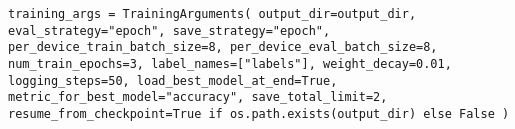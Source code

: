 
\begin{lstlisting}[style=mypython, caption={Training Arguments}] 
training_args = TrainingArguments( output_dir=output_dir, eval_strategy="epoch", save_strategy="epoch", per_device_train_batch_size=8, per_device_eval_batch_size=8, num_train_epochs=3, label_names=["labels"], weight_decay=0.01, logging_steps=50, load_best_model_at_end=True, metric_for_best_model="accuracy", save_total_limit=2, resume_from_checkpoint=True if os.path.exists(output_dir) else False ) \end{lstlisting}